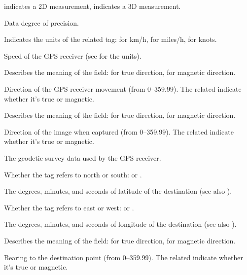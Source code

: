  indicates a 2D measurement,  indicates a 3D measurement.
\apiend

Data degree of precision.
\apiend

Indicates the units of the related  tag: 
 for km/h,  for miles/h,  for knots.
\apiend

Speed of the GPS receiver (see  for the units).
\apiend

Describes the meaning of the  field:  for true
direction,  for magnetic direction.
\apiend

Direction of the GPS receiver movement (from 0--359.99).  The
related  indicate whether it's true or magnetic.
\apiend

Describes the meaning of the  field:  for true
direction,  for magnetic direction.
\apiend

Direction of the image when captured (from 0--359.99).  The
related  indicate whether it's true or magnetic.

\apiend

The geodetic survey data used by the GPS receiver.
\apiend

Whether the  tag refers to north or south:  or 
.
\apiend

The degrees, minutes, and seconds of latitude of the destination (see also 
).
\apiend

Whether the  tag refers to east or west:  or 
.
\apiend

The degrees, minutes, and seconds of longitude of the destination (see also 
).
\apiend

Describes the meaning of the  field:  for true
direction,  for magnetic direction.
\apiend

Bearing to the destination point (from 0--359.99).  The
related  indicate whether it's true or magnetic.
\apiend

